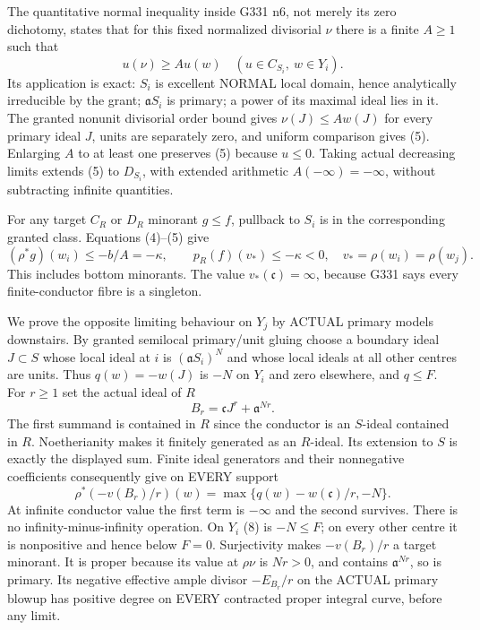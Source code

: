 The quantitative normal inequality inside G331 n6, not merely its zero
dichotomy, states that for this fixed normalized divisorial $\nu$ there
is a finite $A\ge1$ such that
\[
                  u(\nu)\ge A u(w)\quad
       (u\in C_{S_i},\ w\in Y_i).                       \tag{5}
\]
Its application is exact: $S_i$ is excellent NORMAL local domain, hence
analytically irreducible by the grant; $\mathfrak aS_i$ is primary; a
power of its maximal ideal lies in it. The granted nonunit divisorial
order bound gives $\nu(J)\le A w(J)$ for every primary ideal $J$, units
are separately zero, and uniform comparison gives (5). Enlarging $A$ to
at least one preserves (5) because $u\le0$. Taking actual decreasing
limits extends (5) to $D_{S_i}$, with extended arithmetic $A(-\infty)
=-\infty$, without subtracting infinite quantities.

For any target $C_R$ or $D_R$ minorant $g\le f$, pullback to $S_i$ is in
the corresponding granted class. Equations (4)--(5) give
\[
        (\rho^*g)(w_i)\le-b/A=-\kappa,\qquad
        p_R(f)(v_*)\le-\kappa<0,\quad v_*=\rho(w_i)=\rho(w_j).
                                                               \tag{6}
\]
This includes bottom minorants. The value $v_*(\mathfrak c)=\infty$,
because G331 says every finite-conductor fibre is a singleton.

We prove the opposite limiting behaviour on $Y_j$ by ACTUAL primary
models downstairs. By granted semilocal primary/unit gluing choose a
boundary ideal $J\subset S$ whose local ideal at $i$ is
$(\mathfrak aS_i)^N$ and whose local ideals at all other centres are units.
Thus $q(w)=-w(J)$ is $-N$ on $Y_i$ and zero elsewhere, and $q\le F$.
For $r\ge1$ set the actual ideal of $R$
\[
                  B_r=\mathfrak cJ^r+\mathfrak a^{Nr}.    \tag{7}
\]
The first summand is contained in $R$ since the conductor is an $S$-ideal
contained in $R$. Noetherianity makes it finitely generated as an $R$-ideal.
Its extension to $S$ is exactly the displayed sum. Finite ideal generators
and their nonnegative coefficients consequently give on EVERY support
\[
  \rho^*(-v(B_r)/r)(w)
          =\max\{q(w)-w(\mathfrak c)/r,-N\}.              \tag{8}
\]
At infinite conductor value the first term is $-\infty$ and the second
survives. There is no infinity-minus-infinity operation. On $Y_i$ (8)
is $-N\le F$; on every other centre it is nonpositive and hence below
$F=0$. Surjectivity makes $-v(B_r)/r$ a target minorant. It is proper
because its value at $\rho\nu$ is $Nr>0$, and contains
$\mathfrak a^{Nr}$, so is primary. Its negative effective ample divisor
$-E_{B_r}/r$ on the ACTUAL primary blowup has positive degree on EVERY
contracted proper integral curve, before any limit.

